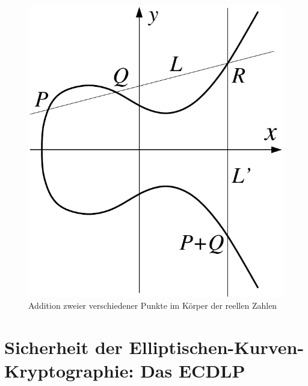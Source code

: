 \begin{refsegment}
\begin{figure}[htbp]
\begin{center}
\includegraphics[scale=0.65]{figures/ec-add}  %
\caption{Addition zweier verschiedener Punkte im Körper der reellen Zahlen} %
\end{center}
\end{figure}


\section[Sicherheit der Elliptischen-Kurven-Kryptographie: Das ECDLP]{\sloppy Sicherheit der Elliptischen-Kurven-Kryptographie: Das ECDLP}


\end{refsegment}
